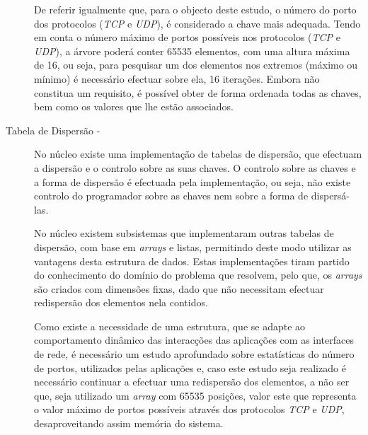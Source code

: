 \begin{description}
De referir igualmente que, para o objecto deste estudo, o número do porto dos protocolos (\textit{TCP} e \textit{UDP}), é considerado a chave mais adequada.
Tendo em conta o número máximo de portos possíveis nos protocolos (\textit{TCP} e \textit{UDP}), a árvore poderá conter 65535 elementos, com uma altura máxima de 16, ou seja, para pesquisar um dos elementos nos extremos (máximo ou mínimo) é necessário efectuar sobre ela, 16 iterações.
Embora não constitua um requisito, é possível obter de forma ordenada todas as chaves, bem como os valores que lhe estão associados.

\item[Tabela de Dispersão - ]
No núcleo existe uma implementação de tabelas de dispersão, que efectuam a dispersão e o controlo sobre as suas chaves.
O controlo sobre as chaves e a forma de dispersão é efectuada pela implementação, ou seja, não existe controlo do programador sobre as chaves nem sobre a forma de dispersá-las.

No núcleo existem subsistemas que implementaram outras tabelas de dispersão, com base em \textit{arrays} e listas, permitindo deste modo utilizar as vantagens desta estrutura de dados.
Estas implementações tiram partido do conhecimento do domínio do problema que resolvem, pelo que, os \textit{arrays} são criados com dimensões fixas, dado que não necessitam efectuar redispersão dos elementos nela contidos.

Como existe a necessidade de uma estrutura, que se adapte ao comportamento dinâmico das interacções das aplicações com as interfaces de rede, é necessário um estudo aprofundado sobre estatísticas do número de portos, utilizados pelas aplicações e, caso este estudo seja realizado é necessário continuar a efectuar uma redispersão dos elementos, a não ser que, seja utilizado um \textit{array} com 65535 posições, valor este que representa o valor máximo de portos possíveis através dos protocolos \textit{TCP} e \textit{UDP}, desaproveitando assim memória do sistema.


\end{description}
\paragraph*{}

